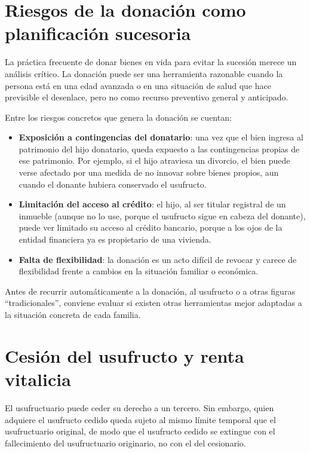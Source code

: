 \documentclass[12pt,oneside]{book}
\begin{document}
\section{Riesgos de la donación como planificación sucesoria}

La práctica frecuente de donar bienes en vida para evitar la sucesión merece un análisis crítico. La donación puede ser una herramienta razonable cuando la persona está en una edad avanzada o en una situación de salud que hace previsible el desenlace, pero no como recurso preventivo general y anticipado.

Entre los riesgos concretos que genera la donación se cuentan:

\begin{itemize}
\item \textbf{Exposición a contingencias del donatario}: una vez que el bien ingresa al patrimonio del hijo donatario, queda expuesto a las contingencias propias de ese patrimonio. Por ejemplo, si el hijo atraviesa un divorcio, el bien puede verse afectado por una medida de no innovar sobre bienes propios, aun cuando el donante hubiera conservado el usufructo.

\item \textbf{Limitación del acceso al crédito}: el hijo, al ser titular registral de un inmueble (aunque no lo use, porque el usufructo sigue en cabeza del donante), puede ver limitado su acceso al crédito bancario, porque a los ojos de la entidad financiera ya es propietario de una vivienda.

\item \textbf{Falta de flexibilidad}: la donación es un acto difícil de revocar y carece de flexibilidad frente a cambios en la situación familiar o económica.
\end{itemize}

Antes de recurrir automáticamente a la donación, al usufructo o a otras figuras ``tradicionales'', conviene evaluar si existen otras herramientas mejor adaptadas a la situación concreta de cada familia.

\section{Cesión del usufructo y renta vitalicia}

El usufructuario puede ceder su derecho a un tercero. Sin embargo, quien adquiere el usufructo cedido queda sujeto al mismo límite temporal que el usufructuario original, de modo que el usufructo cedido se extingue con el fallecimiento del usufructuario originario, no con el del cesionario.
\end{document}
